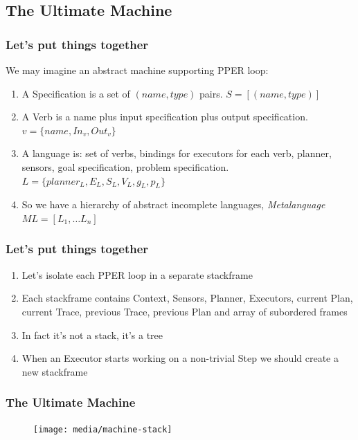 \documentclass{beamer}
\begin{document}
\subsection{The Ultimate Machine}
\begin{frame}
    \frametitle{Let's put things together}  
    We may imagine an abstract machine supporting PPER loop:
\begin{enumerate}
    \item A Specification is a set of $(name, type)$ pairs. $S = [(name, type)]$
    \item A Verb is a name plus input specification plus output specification. $v = \{name, In_v, Out_v\}$
    \item A language is: set of verbs, bindings for executors for each verb, planner, sensors, goal specification, problem specification.
         $L = \{planner_L, E_L, S_L, V_L, g_L, p_L\}$
    \item So we have a hierarchy of abstract incomplete languages, \textit{Metalanguage} $ML = [L_1, \dots L_n]$
\end{enumerate}
\end{frame}

\begin{frame}
    \frametitle{Let's put things together}  
\begin{enumerate}
    \item Let's isolate each PPER loop in a separate stackframe
    \item Each stackframe contains Context, Sensors, Planner, Executors, current Plan, current Trace, previous Trace, previous Plan and array of subordered frames
    \item In fact it's not a stack, it's a tree
    \item When an Executor starts working on a non-trivial Step we should create a new stackframe
\end{enumerate}
\end{frame}

\begin{frame}
    \frametitle{The Ultimate Machine}
    
    \begin{figure}
        \texttt{[image: media/machine-stack]}
    \end{figure}
\end{frame}
\end{document}
